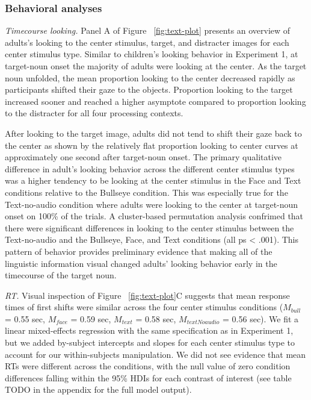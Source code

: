 \documentclass[english,floatsintext,man]{apa6}
\begin{document}
\hypertarget{behavioral-analyses-1}{%
\subsubsection{Behavioral analyses}\label{behavioral-analyses-1}}

\emph{Timecourse looking.} Panel A of Figure ~\ref{fig:text-plot}
presents an overview of adults's looking to the center stimulus, target,
and distracter images for each center stimulus type. Similar to
children's looking behavior in Experiment 1, at target-noun onset the
majority of adults were looking at the center. As the target noun
unfolded, the mean proportion looking to the center decreased rapidly as
participants shifted their gaze to the objects. Proportion looking to
the target increased sooner and reached a higher asymptote compared to
proportion looking to the distracter for all four processing contexts.

After looking to the target image, adults did not tend to shift their
gaze back to the center as shown by the relatively flat proportion
looking to center curves at approximately one second after target-noun
onset. The primary qualitative difference in adult's looking behavior
across the different center stimulus types was a higher tendency to be
looking at the center stimulus in the Face and Text conditions relative
to the Bullseye condition. This was especially true for the
Text-no-audio condition where adults were looking to the center at
target-noun onset on 100\% of the trials. A cluster-based permutation
analysis confrimed that there were significant differences in looking to
the center stimulus between the Text-no-audio and the Bullseye, Face,
and Text conditions (all ps \textless{} .001). This pattern of behavior
provides preliminary evidence that making all of the linguistic
information visual changed adults' looking behavior early in the
timecourse of the target noun.

\emph{RT.} Visual inspection of Figure ~\ref{fig:text-plot}C suggests
that mean response times of first shifts were similar across the four
center stimulus conditions (\(M_{bull}\) = 0.55 sec, \(M_{face}\) = 0.59
sec, \(M_{text}\) = 0.58 sec, \(M_{textNoaudio}\) = 0.56 sec). We fit a
linear mixed-effects regression with the same specification as in
Experiment 1, but we added by-subject intercepts and slopes for each
center stimulus type to account for our within-subjects manipulation. We
did not see evidence that mean RTs were different across the conditions,
with the null value of zero condition differences falling within the
95\% HDIs for each contrast of interest (see table TODO in the appendix
for the full model output).
\end{document}
